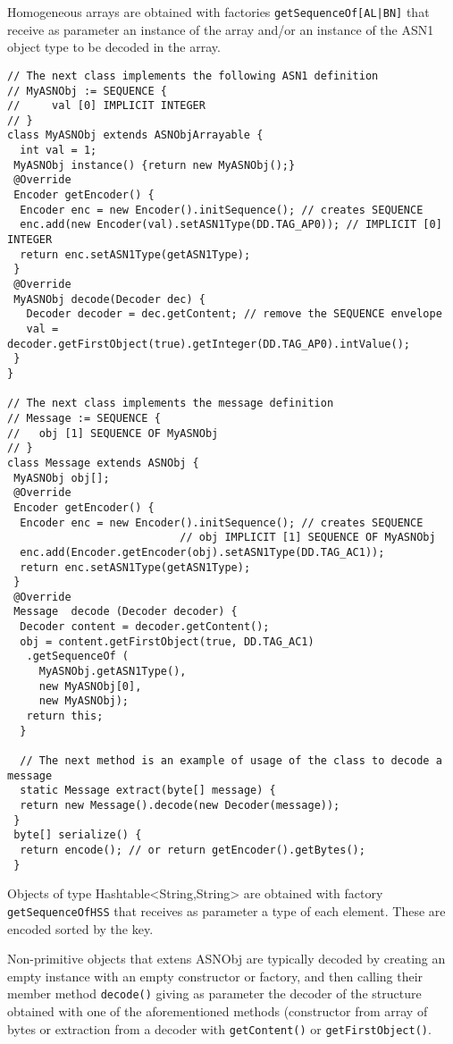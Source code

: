 \documentclass{book}
\newcommand{\mth}[1]{{\tt #1}}
\begin{document}
Homogeneous arrays are obtained with factories \mth{getSequenceOf[AL|BN]} that receive as parameter an instance of the array and/or an
instance of the ASN1 object type to be decoded in the array.

\begin{verbatim}
// The next class implements the following ASN1 definition
// MyASNObj := SEQUENCE {
//     val [0] IMPLICIT INTEGER
// }
class MyASNObj extends ASNObjArrayable {
  int val = 1;
 MyASNObj instance() {return new MyASNObj();}
 @Override
 Encoder getEncoder() {
  Encoder enc = new Encoder().initSequence(); // creates SEQUENCE
  enc.add(new Encoder(val).setASN1Type(DD.TAG_AP0)); // IMPLICIT [0] INTEGER
  return enc.setASN1Type(getASN1Type);
 }
 @Override
 MyASNObj decode(Decoder dec) {
   Decoder decoder = dec.getContent; // remove the SEQUENCE envelope
   val = decoder.getFirstObject(true).getInteger(DD.TAG_AP0).intValue();
 }
}

// The next class implements the message definition
// Message := SEQUENCE {
//   obj [1] SEQUENCE OF MyASNObj
// }
class Message extends ASNObj {
 MyASNObj obj[];
 @Override
 Encoder getEncoder() {
  Encoder enc = new Encoder().initSequence(); // creates SEQUENCE
                           // obj IMPLICIT [1] SEQUENCE OF MyASNObj
  enc.add(Encoder.getEncoder(obj).setASN1Type(DD.TAG_AC1)); 
  return enc.setASN1Type(getASN1Type);
 }
 @Override
 Message  decode (Decoder decoder) {
  Decoder content = decoder.getContent();
  obj = content.getFirstObject(true, DD.TAG_AC1)
   .getSequenceOf (
     MyASNObj.getASN1Type(),
     new MyASNObj[0], 
     new MyASNObj);
   return this;
  }

  // The next method is an example of usage of the class to decode a message
  static Message extract(byte[] message) {
  return new Message().decode(new Decoder(message));
 }
 byte[] serialize() {
  return encode(); // or return getEncoder().getBytes();
 }
\end{verbatim}

Objects of type Hashtable<String,String> are obtained with factory \mth{getSequenceOfHSS} that receives as parameter 
a type of each element. These are encoded sorted by the key.

Non-primitive objects that extens ASNObj are typically decoded by creating an empty instance with an empty constructor or factory,
and then calling their member method \mth{decode()} giving as parameter the decoder of the structure obtained with one of the aforementioned methods (constructor from array of bytes or extraction from a decoder with \mth{getContent()} or
\mth{getFirstObject()}.
\end{document}
